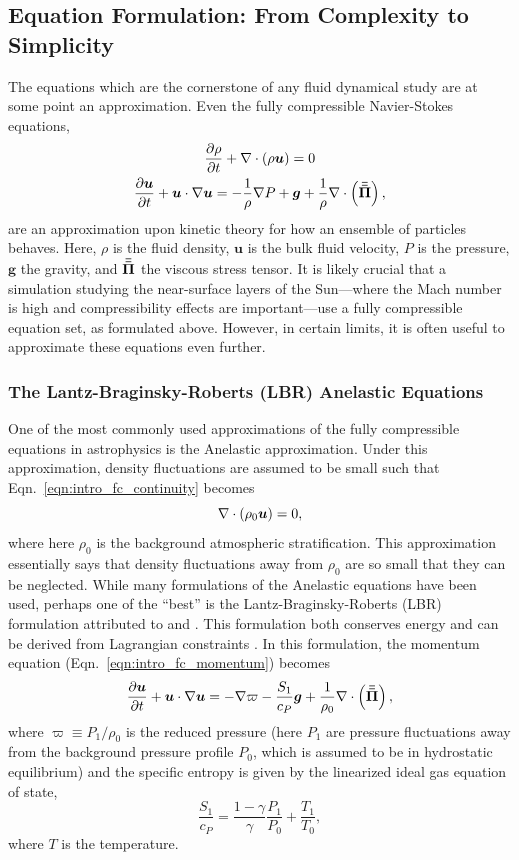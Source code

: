 \subsection{Equation Formulation: From Complexity to Simplicity}
\label{sct:intro_equations}
The equations which are the cornerstone of any fluid dynamical study are at some point an approximation.
Even the fully compressible Navier-Stokes equations,
\begin{gather}
\frac{\partial \rho}{\partial t} + \nabla\cdot\left( \rho\bm{u}\right) = 0 
\label{eqn:intro_fc_continuity}
\\
\frac{\partial \bm{u}}{\partial t} + \bm{u}\cdot\nabla\bm{u} = -\frac{1}{\rho}\nabla P + \bm{g} + \frac{1}{\rho}\nabla\cdot\left( \bm{\bar{\bar{\Pi}}}\right),
\label{eqn:intro_fc_momentum}
\end{gather}
are an approximation upon kinetic theory for how an ensemble of particles behaves.
Here, $\rho$ is the fluid density, $\bm{u}$ is the bulk fluid velocity, $P$ is the pressure, $\bm{g}$ the gravity, and $\bm{\bar{\bar{\Pi}}}$ the viscous stress tensor.
It is likely crucial that a simulation studying the near-surface layers of the Sun---where the Mach number is high and compressibility effects are important---use a fully compressible equation set, as formulated above.
However, in certain limits, it is often useful to approximate these equations even further.

\subsubsection{The Lantz-Braginsky-Roberts (LBR) Anelastic Equations}
One of the most commonly used approximations of the fully compressible equations in astrophysics is the Anelastic approximation.
Under this approximation, density fluctuations are assumed to be small such that Eqn.~\ref{eqn:intro_fc_continuity} becomes
\begin{equation}
\nabla\cdot\left( \rho_0 \bm{u}\right) = 0,
\label{eqn:intro_an_continuity}
\end{equation}
where here $\rho_0$ is the background atmospheric stratification.
This approximation essentially says that density fluctuations away from $\rho_0$ are so small that they can be neglected.
While many formulations of the Anelastic equations have been used, perhaps one of the ``best'' is the Lantz-Braginsky-Roberts (LBR) formulation attributed to \citet{lantz1992} and \citet{braginsky&roberts1995}.
This formulation both conserves energy \citep{brown&all2012} and can be derived from Lagrangian constraints \citep{vasil&all2013}.
In this formulation, the momentum equation (Eqn.~\ref{eqn:intro_fc_momentum}) becomes
\begin{equation}
\frac{\partial \bm{u}}{\partial t} + \bm{u}\cdot\nabla\bm{u} = -\nabla \varpi - \frac{S_1}{c_P} \bm{g} + \frac{1}{\rho_0}\nabla\cdot\left( \bm{\bar{\bar{\Pi}}}\right),
\label{eqn:intro_an_momentum}
\end{equation}
where $\varpi \equiv P_1 / \rho_0$ is the reduced pressure (here $P_1$ are pressure fluctuations away from the background pressure profile $P_0$, which is assumed to be in hydrostatic equilibrium) and the specific entropy is given by the linearized ideal gas equation of state,
$$
\frac{S_1}{c_P} = \frac{1-\gamma}{\gamma}\frac{P_1}{P_0} + \frac{T_1}{T_0},
$$
where $T$ is the temperature.

